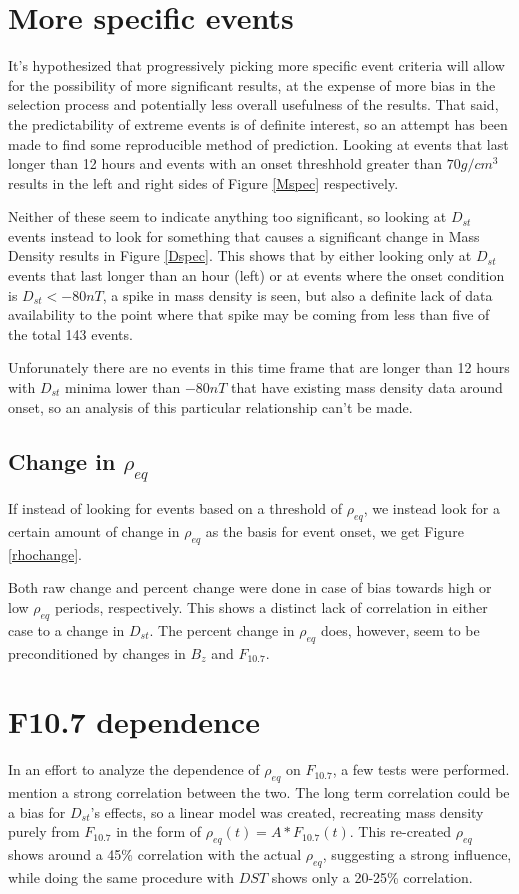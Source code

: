 \documentclass[10pt,twocolumn]{article}
\begin{document}
\section{More specific events}
It's hypothesized that progressively picking more specific event criteria will allow for the possibility of more significant results, at the expense of more bias in the selection process and potentially less overall usefulness of the results. That said, the predictability of extreme events is of definite interest, so an attempt has been made to find some reproducible method of prediction. Looking at events that last longer than 12 hours and events with an onset threshhold greater than $70g/cm^3$ results in the left and right sides of Figure \ref{Mspec} respectively.



Neither of these seem to indicate anything too significant, so looking at $D_{st}$ events instead to look for something that causes a significant change in Mass Density results in Figure \ref{Dspec}. This shows that by either looking only at $D_{st}$ events that last longer than an hour (left) or at events where the onset condition is $D_{st}<-80nT$, a spike in mass density is seen, but also a definite lack of data availability to the point where that spike may be coming from less than five of the total 143 events. 



Unforunately there are no events in this time frame that are longer than 12 hours with $D_{st}$ minima lower than $-80nT$ that have existing mass density data around onset, so an analysis of this particular relationship can't be made.

\subsection{Change in $\rho_{eq}$}
If instead of looking for events based on a threshold of $\rho_{eq}$, we instead look for a certain amount of change in $\rho_{eq}$ as the basis for event onset, we get Figure \ref{rhochange}.



Both raw change and percent change were done in case of bias towards high or low $\rho_{eq}$ periods, respectively. This shows a distinct lack of correlation in either case to a change in $D_{st}$. The percent change in $\rho_{eq}$ does, however, seem to be preconditioned by changes in $B_z$ and $F_{10.7}$.



\section{F10.7 dependence}
In an effort to analyze the dependence of $\rho_{eq}$ on $F_{10.7}$, a few tests were performed. \cite{Takahashi2010} mention a strong correlation between the two. The long term correlation could be a bias for $D_{st}$'s effects, so a linear model was created, recreating mass density purely from $F_{10.7}$ in the form of $\rho_{eq}(t)=A*F_{10.7}(t)$. This re-created $\rho_{eq}$ shows around a 45\% correlation with the actual $\rho_{eq}$, suggesting a strong influence, while doing the same procedure with $DST$ shows only a 20-25\% correlation. 
\end{document}
